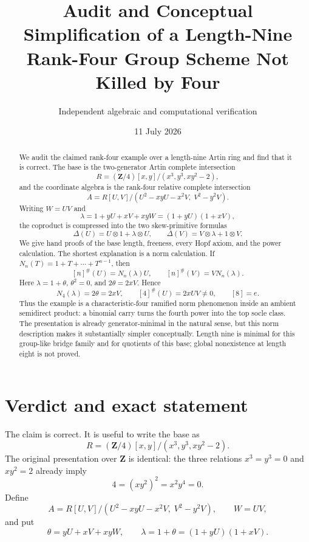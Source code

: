 \documentclass[11pt]{article}
\title{Audit and Conceptual Simplification of a Length-Nine\\
Rank-Four Group Scheme Not Killed by Four}
\author{Independent algebraic and computational verification}
\date{11 July 2026}
\theoremstyle{remark}
\newcommand{\Z}{\mathbf Z}
\newcommand{\ot}{\otimes}
\begin{document}
\maketitle

\begin{abstract}
We audit the claimed rank-four example over a length-nine Artin ring and find
that it is correct.  The base is the two-generator Artin complete intersection
\[
 R=(\Z/4)[x,y]/(x^3,y^3,xy^2-2),
\]
and the coordinate algebra is the rank-four relative complete intersection
\[
 A=R[U,V]/(U^2-xyU-x^2V,\;V^2-y^2V).
\]
Writing $W=UV$ and
\[
 \lambda=1+yU+xV+xyW=(1+yU)(1+xV),
\]
the coproduct is compressed into the two skew-primitive formulas
\[
 \Delta(U)=U\ot1+\lambda\ot U,
 \qquad
 \Delta(V)=V\ot\lambda+1\ot V.
\]
We give hand proofs of the base length, freeness, every Hopf axiom, and the
power calculation.  The shortest explanation is a norm calculation.  If
$N_n(T)=1+T+\cdots+T^{n-1}$, then
\[
 [n]^\#(U)=N_n(\lambda)U,
 \qquad [n]^\#(V)=VN_n(\lambda).
\]
Here $\lambda=1+\theta$, $\theta^2=0$, and $2\theta=2xV$.  Hence
\[
 N_4(\lambda)=2\theta=2xV,
 \qquad [4]^\#(U)=2xUV\ne0,
 \qquad [8]=e.
\]
Thus the example is a characteristic-four ramified norm phenomenon inside an
ambient semidirect product: a binomial carry turns the fourth power into the
top socle class.
The presentation is already generator-minimal in the natural sense, but this
norm description makes it substantially simpler conceptually.  Length nine
is minimal for this group-like bridge family and for quotients of this base;
global nonexistence at length eight is not proved.
\end{abstract}

\tableofcontents

\section{Verdict and exact statement}

The claim is correct.  It is useful to write the base as
\begin{equation}\label{eq:R}
 R=(\Z/4)[x,y]/(x^3,y^3,xy^2-2).
\end{equation}
The original presentation over $\Z$ is identical: the three relations
$x^3=y^3=0$ and $xy^2=2$ already imply
\[
 4=(xy^2)^2=x^2y^4=0.
\]
Define
\begin{equation}\label{eq:A}
 A=R[U,V]/(U^2-xyU-x^2V,\;V^2-y^2V),
 \qquad W=UV,
\end{equation}
and put
\begin{equation}\label{eq:theta-lambda}
 \theta=yU+xV+xyW,
 \qquad
 \lambda=1+\theta=(1+yU)(1+xV).
\end{equation}
\end{document}
